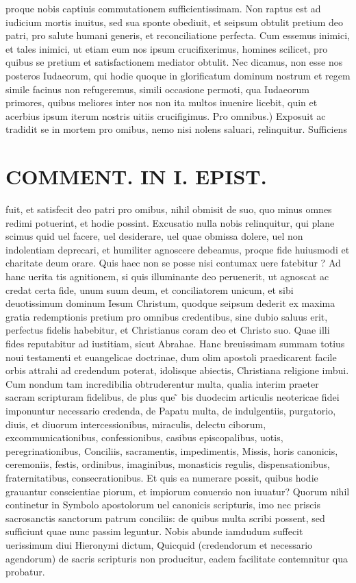 \documentclass{article}
\begin{document}
\begin{pages}
proque nobis captiuis commutationem sufficientissimam. Non raptus est ad iudicium mortis inuitus, sed sua sponte obediuit, et seipsum obtulit pretium deo patri, pro salute humani generis, et reconciliatione perfecta. Cum essemus inimici, et tales inimici, ut etiam eum nos ipsum crucifixerimus, homines scilicet, pro quibus se pretium et satisfactionem mediator obtulit. Nec dicamus, non esse nos posteros Iudaeorum, qui hodie quoque in glorificatum dominum nostrum et regem simile facinus non refugeremus, simili occasione permoti, qua Iudaeorum primores, quibus meliores inter nos non ita multos inuenire licebit, quin et acerbius ipsum iterum nostris uitiis crucifigimus. Pro omnibus.) Exposuit ac tradidit se in mortem pro omibus, nemo nisi nolens saluari, relinquitur. Sufficiens  \pend
\section*{COMMENT. IN I. EPIST. }
\marginpar{[ p.484 ]}\pstart fuit, et satisfecit deo patri pro omibus, nihil obmisit de suo, quo minus omnes redimi potuerint, et hodie possint. Excusatio nulla nobis relinquitur, qui plane scimus quid uel facere, uel desiderare, uel quae obmissa dolere, uel non indolentiam deprecari, et humiliter agnoscere debeamus, proque fide huiusmodi et charitate deum orare. Quis haec non se posse nisi contumax uere fatebitur ? Ad hanc uerita tis agnitionem, si quis illuminante deo peruenerit, ut agnoscat ac credat certa fide, unum suum deum, et conciliatorem unicum, et sibi deuotissimum dominum Iesum Christum, quodque seipsum dederit ex maxima gratia redemptionis pretium pro omnibus credentibus, sine dubio saluus erit, perfectus fidelis habebitur, et Christianus coram deo et Christo suo. Quae illi fides reputabitur ad iustitiam, sicut Abrahae. Hanc breuissimam summam totius noui testamenti et euangelicae doctrinae, dum olim apostoli praedicarent facile orbis attrahi ad credendum poterat, idolisque abiectis, Christiana religione imbui. Cum nondum tam incredibilia obtruderentur multa, qualia interim praeter sacram scripturam fidelibus, de plus que ̃ bis duodecim articulis neotericae fidei imponuntur necessario credenda, de Papatu multa, de indulgentiis, purgatorio, diuis, et diuorum intercessionibus, miraculis, delectu ciborum, excommunicationibus, confessionibus, casibus episcopalibus, uotis, peregrinationibus, Conciliis, sacramentis, impedimentis, Missis, horis canonicis, ceremoniis, festis, ordinibus, imaginibus, monasticis regulis, dispensationibus, fraternitatibus, consecrationibus. Et quis ea numerare possit, quibus hodie grauantur conscientiae piorum, et impiorum conuersio non iuuatur? Quorum nihil continetur in Symbolo apostolorum uel canonicis scripturis, imo nec priscis sacrosanctis sanctorum patrum conciliis: de quibus multa scribi possent, sed sufficiunt quae nunc passim leguntur. Nobis abunde iamdudum suffecit uerissimum diui Hieronymi dictum, Quicquid (credendorum et necessario agendorum) de sacris scripturis non producitur, eadem facilitate contemnitur qua probatur.  \pend
{}
{}

\end{pages}
\end{document}
